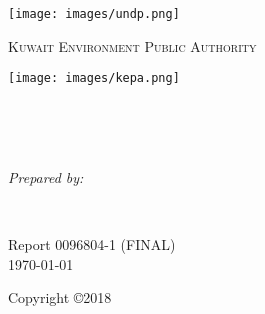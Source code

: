 \documentclass[
12pt, %
oneside, %
english, %
singlespacing, %
nolistspacing, %
liststotoc, %
parskip, %
headsepline, %
chapterinoneline, %
]{MastersDoctoralThesis} %
\author{Brian Freeman, PE} %
\begin{document}
\frontmatter %

\pagestyle{plain} %


\begin{titlepage}
\begin{center}

\vspace*{.02\textheight}
{\scshape\LARGE \univname\par} %
\begin{center}
\texttt{[image: images/undp.png]} %
\end{center}
\textsc{\LARGE Kuwait Environment Public Authority}\\[0.5cm] 
\begin{center}
\texttt{[image: images/kepa.png]} %
\end{center}
\HRule \\[0.4cm] %
{\huge \bfseries \ttitle\par}\vspace{0.4cm} %
\HRule \\[1.5cm] %
\begin{minipage}[t]{0.4\textwidth}
\begin{flushleft} \large
\emph{Prepared by:}\\
{\authorname} %
\end{flushleft}
\end{minipage}
\begin{minipage}[t]{0.4\textwidth}
\begin{flushright} \large

\end{flushright}
\end{minipage}\\[1cm]
 
\vfill

 Report 0096804-1 (FINAL)\\
 
\vfill
{\large \today}\\[2cm] %
\vfill
\end{center}
Copyright \copyright 2018
\end{titlepage}
\end{document}
